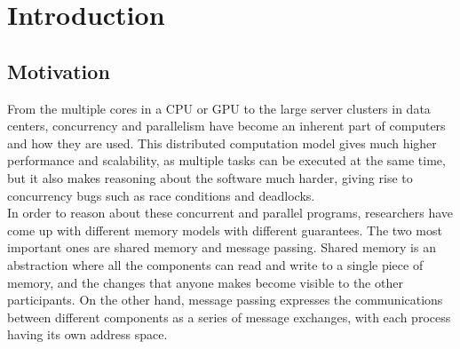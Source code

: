 \documentclass[12pt,twoside]{report}
\begin{document}
\cleardoublepage


\tableofcontents 


\clearpage{\pagestyle{empty}\cleardoublepage}
\setcounter{page}{1}
\fancyhead[LE,RO]{\slshape \rightmark}
\fancyhead[LO,RE]{\slshape \leftmark}

\chapter{Introduction}
\section{Motivation}

From the multiple cores in a CPU or GPU to the large server clusters in data centers, concurrency and parallelism have become an inherent part of computers and how they are used. This distributed computation model gives much higher performance and scalability, as multiple tasks can be executed at the same time, but it also makes reasoning about the software much harder, giving rise to concurrency bugs such as race conditions and deadlocks.\\

In order to reason about these concurrent and parallel programs, researchers have come up with different memory models with different guarantees. The two most important ones are shared memory and message passing. Shared memory is an abstraction where all the components can read and write to a single piece of memory, and the changes that anyone makes become visible to the other participants. On the other hand, message passing expresses the communications between different components as a series of message exchanges, with each process having its own address space. %
\\
\end{document}
